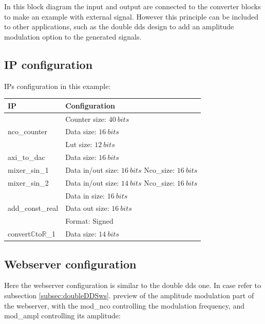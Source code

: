 \documentclass[12pt,oneside]{article}
\begin{document}
In this block diagram the input and output are connected to the converter blocks to make an example with external signal. However this principle can be included to other applications, such as the double dds design to add an amplitude modulation option to the generated signals.
\vspace{-0.3cm}
\subsection{IP configuration}
\vspace{-0cm}
IPs configuration in this example:
\begin{center}
	\begin{tabular}{|>{\centering\arraybackslash}m{.3\linewidth} | >{\centering\arraybackslash}m{.3\linewidth} |}
		\hline
		IP & Configuration \\
		\hline
		& Counter size: $40~bits$\\ nco\_counter &Data size: $16~bits$\\ &Lut size: $12~bits$ \\
		\hline
		axi\_to\_dac&Data size: $16~bits$ \\
		\hline
		mixer\_sin\_1&Data in/out size: $16~bits$ \newline Nco\_size: $16~bits$ \\
		\hdashline
		mixer\_sin\_2&Data in/out size: $14~bits$ \newline Nco\_size: $16~bits$ \\
		\hline
		& Data in size: $16~bits$\\add\_const\_real & Data out size: $16~bits$\\ &Format: Signed \\
		\hline
		convert$\mathbb{C}$to$\mathbb{R}$\_1&Data size: $14~bits$\\
		\hline
	\end{tabular}
\end{center}
\vspace{-0.2cm}
\subsection{Webserver configuration}

Here the webserver configuration is similar to the double dds one. In case refer to subsection \ref{subsec:doubleDDSws}. preview of the amplitude modulation part of the webserver, with the mod\_nco controlling the modulation frequency, and mod\_ampl controlling its amplitude:
\end{document}

